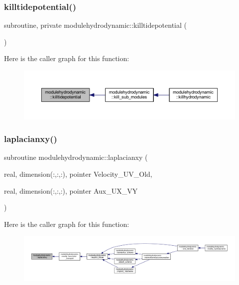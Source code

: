 \subsubsection{\texorpdfstring{killtidepotential()}{killtidepotential()}}
{\footnotesize\ttfamily subroutine, private modulehydrodynamic\+::killtidepotential (\begin{DoxyParamCaption}{ }\end{DoxyParamCaption})\hspace{0.3cm}{\ttfamily [private]}}

Here is the caller graph for this function\+:\nopagebreak
\begin{figure}[H]
\begin{center}
\leavevmode
\includegraphics[width=350pt]{namespacemodulehydrodynamic_ab35b45e7f241087188692a17e57b81fe_icgraph}
\end{center}
\end{figure}
\mbox{\label{namespacemodulehydrodynamic_ace3608af017892be075e4a7361ccedb6}} 
\subsubsection{\texorpdfstring{laplacianxy()}{laplacianxy()}}
{\footnotesize\ttfamily subroutine modulehydrodynamic\+::laplacianxy (\begin{DoxyParamCaption}\item[{real, dimension(\+:,\+:,\+:), pointer}]{Velocity\+\_\+\+U\+V\+\_\+\+Old,  }\item[{real, dimension(\+:,\+:,\+:), pointer}]{Aux\+\_\+\+U\+X\+\_\+\+VY }\end{DoxyParamCaption})\hspace{0.3cm}{\ttfamily [private]}}

Here is the caller graph for this function\+:\nopagebreak
\begin{figure}[H]
\begin{center}
\leavevmode
\includegraphics[width=350pt]{namespacemodulehydrodynamic_ace3608af017892be075e4a7361ccedb6_icgraph}
\end{center}
\end{figure}
\mbox{\label{namespacemodulehydrodynamic_a24dd92fa72c14784cca1137f274f1cbd}} 
